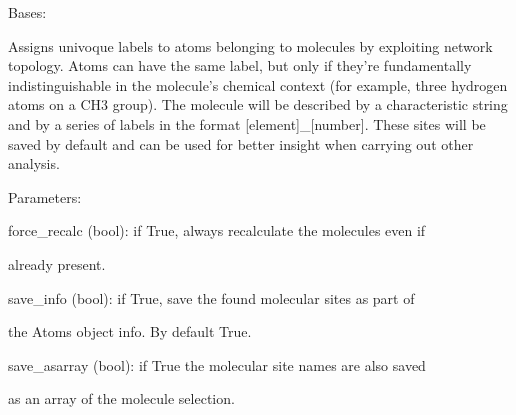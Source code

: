\documentclass[letterpaper,10pt,english]{sphinxmanual}
\begin{document}

\begin{fulllineitems}
\label{doctree/soprano.properties.labeling.labeling:soprano.properties.labeling.labeling.MoleculeSites}
Bases: {\hyperref[doctree/soprano.properties.atomsproperty:soprano.properties.atomsproperty.AtomsProperty]{}}

Assigns univoque labels to atoms belonging to molecules by exploiting
network topology. Atoms can have the same label, but only if they're
fundamentally indistinguishable in the molecule's chemical context
(for example, three hydrogen atoms on a CH3 group). The molecule will be
described by a characteristic string and by a series of labels in the
format {[}element{]}\_{[}number{]}. These sites will be saved by default and can
be used for better insight when carrying out other analysis.

\begin{DUlineblock}{0em}
\item[] Parameters:
\item[]
\begin{DUlineblock}{\DUlineblockindent}
\item[] force\_recalc (bool): if True, always recalculate the molecules even if
\item[]
\begin{DUlineblock}{\DUlineblockindent}
\item[] already present.
\end{DUlineblock}
\item[] save\_info (bool): if True, save the found molecular sites as part of
\item[]
\begin{DUlineblock}{\DUlineblockindent}
\item[] the Atoms object info. By default True.
\end{DUlineblock}
\item[] save\_asarray (bool): if True the molecular site names are also saved
\item[]
\begin{DUlineblock}{\DUlineblockindent}
\item[] as an array of the molecule selection.
\end{DUlineblock}
\end{DUlineblock}
\end{DUlineblock}


\end{fulllineitems}
\end{document}
